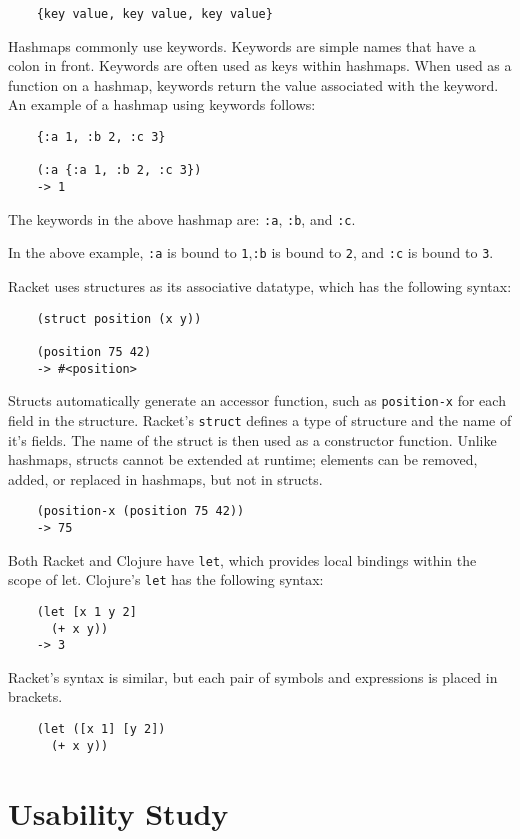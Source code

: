 \documentclass[12pt]{article}
\begin{document}
\begin{verbatim}
	{key value, key value, key value}
\end{verbatim}

Hashmaps commonly use keywords. Keywords are simple names that have a colon in front. Keywords are often used as keys within hashmaps. 
When used as a function on a hashmap, keywords return the value associated with the keyword. 
An example of a hashmap using keywords follows: 

\begin{verbatim}
	{:a 1, :b 2, :c 3}
	
	(:a {:a 1, :b 2, :c 3})
	-> 1
\end{verbatim}

The keywords in the above hashmap are: \texttt{:a}, \texttt{:b}, and \texttt{:c}.

In the above example, \texttt{:a} is bound to \texttt{1},\texttt{:b} is bound to \texttt{2}, and \texttt{:c} is bound to \texttt{3}.


Racket uses structures as its associative datatype, which has the following syntax:
\begin{verbatim}
	(struct position (x y))
	
	(position 75 42)
	-> #<position>
\end{verbatim}
Structs automatically generate an accessor function, such as \texttt{position-x} for each field in the structure. Racket's \texttt{struct} defines a type of structure and the name of it's fields. The name of the struct is then used as a constructor function. Unlike hashmaps, structs cannot be extended at runtime; elements can be removed, added, or replaced in hashmaps, but not in structs.
\begin{verbatim}
	(position-x (position 75 42))
	-> 75
\end{verbatim}

Both Racket and Clojure have \texttt{let}, which provides local bindings within the scope of let. Clojure's \texttt{let} has the following syntax:
\begin{verbatim}
	(let [x 1 y 2]
	  (+ x y))
	-> 3
\end{verbatim}
Racket's syntax is similar, but each pair of symbols and expressions is placed in brackets.
\begin{verbatim}
	(let ([x 1] [y 2])
	  (+ x y))
\end{verbatim}

\section{Usability Study}\label{sec:study}
\end{document}
